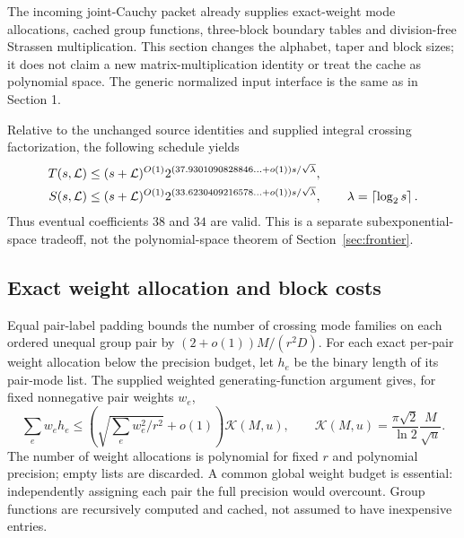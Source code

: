 The incoming joint-Cauchy packet already supplies exact-weight mode allocations, cached group functions, three-block boundary tables and division-free Strassen multiplication. This section changes the alphabet, taper and block sizes; it does not claim a new matrix-multiplication identity or treat the cache as polynomial space. The generic normalized input interface is the same as in Section 1.

\begin{theorem}
Relative to the unchanged source identities and supplied integral crossing factorization, the following schedule yields
\begin{align*}
 T(s,\mathcal L)&\le(s+\mathcal L)^{O(1)}
 2^{(37.9301090828846\ldots+o(1))s/\sqrt\lambda},\\
 S(s,\mathcal L)&\le(s+\mathcal L)^{O(1)}
 2^{(33.6230409216578\ldots+o(1))s/\sqrt\lambda},
 \qquad\lambda=\left\lceil\log_2s\right\rceil.
\end{align*}
Thus eventual coefficients $38$ and $34$ are valid. This is a separate subexponential-space tradeoff, not the polynomial-space theorem of Section~\ref{sec:frontier}.
\end{theorem}

\subsection{Exact weight allocation and block costs}
Equal pair-label padding bounds the number of crossing mode families on each ordered unequal group pair by $(2+o(1))M/(r^2D)$. For each exact per-pair weight allocation below the precision budget, let $h_e$ be the binary length of its pair-mode list. The supplied weighted generating-function argument gives, for fixed nonnegative pair weights $w_e$,
\begin{equation}\label{eq:cache-entropy}
 \sum_e w_eh_e\le\left(\sqrt{\sum_e w_e^2/r^2}+o(1)\right)\mathcal K(M,u),
 \qquad\mathcal K(M,u)=\frac{\pi\sqrt2}{\ln2}\frac M{\sqrt u}.
\end{equation}
The number of weight allocations is polynomial for fixed $r$ and polynomial precision; empty lists are discarded. A common global weight budget is essential: independently assigning each pair the full precision would overcount. Group functions are recursively computed and cached, not assumed to have inexpensive entries.


